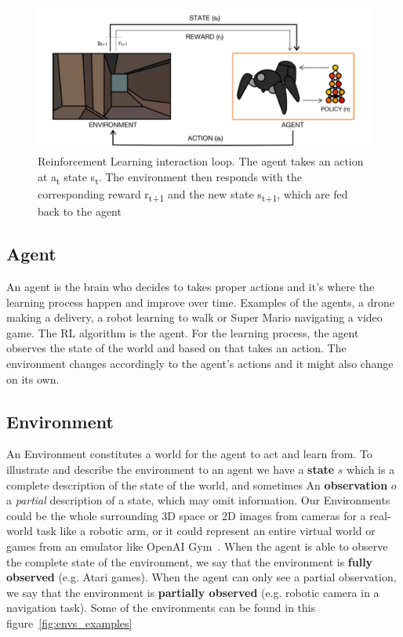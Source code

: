 \begin{figure}[H]
	\centering
		\includegraphics[width=.5\linewidth]{figures/Agent-Env.png}
		\caption{Reinforcement Learning interaction loop. The agent takes an action at a\textsubscript{t} state s\textsubscript{t}. The environment then responds with the corresponding reward r\textsubscript{t+1} and the new state s\textsubscript{t+1}, which are fed back to the agent~\parencite{arulkumaran2017brief}}
		\label{fig:agent_env}
\end{figure}

\subsection{Agent}\label{Agent}
An agent is the brain who decides to takes proper actions and it's where the learning process happen and improve over time. Examples of the agents, a drone making a delivery, a robot learning to walk or Super Mario navigating a video game. The RL algorithm is the agent. For the learning process, the agent observes the state of the world and based on that takes an action. The environment changes accordingly to the agent's actions and it might also change on its own. 


\subsection{Environment}\label{Environment}
An Environment constitutes a world for the agent to act and learn from. 
To illustrate and describe the environment to an agent we have a \textbf{state} \(s\) which is a complete description of the state of the world, and sometimes An \textbf{observation} \(o\) a \textit{partial} description of a state, which may omit information.
Our Environments could be the whole surrounding 3D space or 2D images from cameras for a real-world task like a robotic arm, or it could represent an entire virtual world or games from an emulator like OpenAI Gym~\parencite{brockman2016openai}.
When the agent is able to observe the complete state of the environment, we say that the environment is \textbf{fully observed} (e.g. Atari games). When the agent can only see a partial observation, we say that the environment is \textbf{partially observed} (e.g. robotic camera in a navigation task).
Some of the environments can be found in this figure~\ref{fig:envs_examples}

